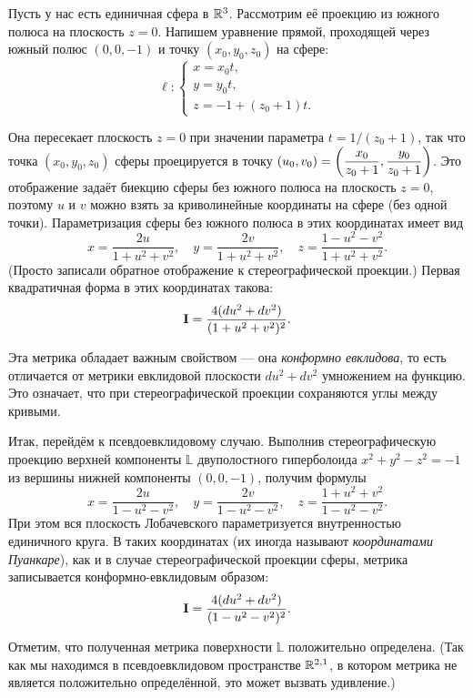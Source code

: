 Пусть у нас есть единичная сфера в $\mathbb{R}^3$. Рассмотрим её проекцию из южного полюса на плоскость $z = 0$. Напишем уравнение прямой, проходящей через южный полюс $(0, 0, -1)$ и точку $(x_0, y_0, z_0)$ на сфере:
\[
	\ell\colon
	\begin{cases}
		x = x_0t,\\
		y = y_0t,\\
		z = -1 + (z_0 + 1)t.
	\end{cases}
\]

Она пересекает плоскость $z = 0$ при значении параметра $t = 1 / (z_0 + 1)$, так что точка $(x_0, y_0, z_0)$ сферы проецируется в точку $(u_0, v_0) = \displaystyle\left(\frac{x_0}{z_0 + 1}, \frac{y_0}{z_0 + 1}\right)$. Это отображение задаёт биекцию сферы без южного полюса на плоскость $z = 0$, поэтому $u$ и $v$ можно взять за криволинейные координаты на сфере (без одной точки). Параметризация сферы без южного полюса в этих координатах имеет вид
\[
	x = \frac{2u}{1 + u^2 + v^2},\quad y = \frac{2v}{1 + u^2 + v^2},\quad z = \frac{1 - u^2 - v^2}{1 + u^2 + v^2}.
\]
(Просто записали обратное отображение к стереографической проекции.) Первая квадратичная форма в этих координатах такова:
\[
	\boldsymbol{\operatorname{I}} = \frac{4(du^2 + dv^2)}{(1 + u^2 + v^2)^2}.
\]

Эта метрика обладает важным свойством --- она \textit{конформно евклидова}, то есть отличается от метрики евклидовой плоскости $du^2 + dv^2$ умножением на функцию. Это означает, что при стереографической проекции сохраняются углы между кривыми.

Итак, перейдём к псевдоевклидовому случаю. Выполнив стереографическую проекцию верхней компоненты $\mathbb{L}$ двуполостного гиперболоида $x^2 + y^2 - z^2 = -1$ из вершины нижней компоненты $(0, 0, -1)$, получим формулы
\[
	x = \frac{2u}{1 - u^2 - v^2},\quad y = \frac{2v}{1 - u^2 - v^2},\quad z = \frac{1 + u^2 + v^2}{1 - u^2 - v^2}.
\]
При этом вся плоскость Лобачевского параметризуется внутренностью единичного круга. В таких координатах (их иногда называют \textit{координатами Пуанкаре}), как и в случае стереографической проекции сферы, метрика записывается конформно-евклидовым образом:
\begin{equation} \label{eq:PoincareMetrics}
	\boldsymbol{\operatorname{I}} = \frac{4(du^2 + dv^2)}{(1 - u^2 - v^2)^2}.
\end{equation}

Отметим, что полученная метрика поверхности $\mathbb{L}$ положительно определена. (Так как мы находимся в псевдоевклидовом пространстве $\mathbb{R}^{2, 1}$, в котором метрика не является положительно определённой, это может вызвать удивление.)

